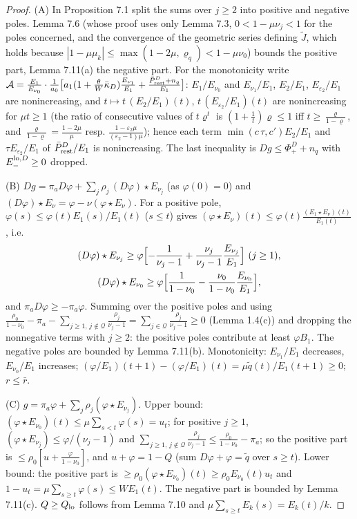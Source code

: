 \documentclass[11pt,a4paper]{article}
\theoremstyle{definition}
\theoremstyle{remark}
\begin{document}
\begin{proof}
(A) In Proposition 7.1 split the sums over $j\ge2$ into positive and negative poles. Lemma 7.6 (whose proof uses only Lemma 7.3, $0<1-\mu\nu_j<1$ for the poles concerned, and the convergence of the geometric series defining $\tilde J$, which holds because $|1-\mu\mu_k|\le\max(1-2\mu,\varrho_q)<1-\mu\nu_0$) bounds the positive part, Lemma 7.11(a) the negative part. For the monotonicity write $\mathcal A=\frac{E_1}{E_{\nu_0}}\cdot\frac{1}{a_0}\bigl[a_1(1+\frac\theta W\bar\kappa_D)\frac{E_{\nu_1}}{E_1}+\frac{\bar P^D_{\rm rest}+n_q}{E_1}\bigr]$: $E_1/E_{\nu_0}$ and $E_{\nu_1}/E_1$, $E_2/E_1$, $E_{\varepsilon_2}/E_1$ are nonincreasing, and $t\mapsto t\,(E_2/E_1)(t)$, $t\,(E_{\varepsilon_2}/E_1)(t)$ are nonincreasing for $\mu t\ge1$ (the ratio of consecutive values of $t\varrho^t$ is $(1+\frac1t)\varrho\le1$ iff $t\ge\frac{\varrho}{1-\varrho}$, and $\frac{\varrho}{1-\varrho}=\frac{1-2\mu}{\mu}$ resp. $\frac{1-\varepsilon_2\mu}{(\varepsilon_2-1)\mu}$); hence each term $\min(c\,\tau,c')E_2/E_1$ and $\tau E_{\varepsilon_2}/E_1$ of $\bar P^D_{\rm rest}/E_1$ is nonincreasing. The last inequality is $Dg\le\Phi^D_++n_q$ with $E_-^{{\rm lo},D}\ge0$ dropped.

(B) $Dg=\pi_aD\varphi+\sum_j\rho_j\,(D\varphi)\star E_{\nu_j}$ (as $\varphi(0)=0$) and $(D\varphi)\star E_\nu=\varphi-\nu(\varphi\star E_\nu)$. For a positive pole, $\varphi(s)\le\varphi(t)E_1(s)/E_1(t)$ ($s\le t$) gives $(\varphi\star E_\nu)(t)\le\varphi(t)\frac{(E_1\star E_\nu)(t)}{E_1(t)}$, i.e.
\begin{gather*}
(D\varphi)\star E_{\nu_j}\ge\varphi\Bigl[-\frac{1}{\nu_j-1}+\frac{\nu_j}{\nu_j-1}\frac{E_{\nu_j}}{E_1}\Bigr]\ (j\ge1), \\
(D\varphi)\star E_{\nu_0}\ge\varphi\Bigl[\frac{1}{1-\nu_0}-\frac{\nu_0}{1-\nu_0}\frac{E_{\nu_0}}{E_1}\Bigr],
\end{gather*}
and $\pi_aD\varphi\ge-\pi_a\varphi$. Summing over the positive poles and using $\frac{\rho_0}{1-\nu_0}-\pi_a-\sum_{j\ge1,\,j\notin\mathcal Q}\frac{\rho_j}{\nu_j-1}=\sum_{j\in\mathcal Q}\frac{\rho_j}{\nu_j-1}\ge0$ (Lemma 1.4(c)) and dropping the nonnegative terms with $j\ge2$: the positive poles contribute at least $\varphi B_1$. The negative poles are bounded by Lemma 7.11(b). Monotonicity: $E_{\nu_1}/E_1$ decreases, $E_{\nu_0}/E_1$ increases; $(\varphi/E_1)(t+1)-(\varphi/E_1)(t)=\mu\tilde q(t)/E_1(t+1)\ge0$; $r\le\bar r$.

(C) $g=\pi_a\varphi+\sum_j\rho_j(\varphi\star E_{\nu_j})$. Upper bound: $(\varphi\star E_{\nu_0})(t)\le\mu\sum_{s<t}\varphi(s)=u_t$; for positive $j\ge1$, $(\varphi\star E_{\nu_j})\le\varphi/(\nu_j-1)$ and $\sum_{j\ge1,\,j\notin\mathcal Q}\frac{\rho_j}{\nu_j-1}\le\frac{\rho_0}{1-\nu_0}-\pi_a$; so the positive part is $\le\rho_0[u+\frac{\varphi}{1-\nu_0}]$, and $u+\varphi=1-Q$ (sum $D\varphi+\varphi=\tilde q$ over $s\ge t$). Lower bound: the positive part is $\ge\rho_0(\varphi\star E_{\nu_0})(t)\ge\rho_0E_{\nu_0}(t)u_t$ and $1-u_t=\mu\sum_{s\ge t}\varphi(s)\le WE_1(t)$. The negative part is bounded by Lemma 7.11(c). $Q\ge Q_{\rm lo}$ follows from Lemma 7.10 and $\mu\sum_{s\ge t}E_k(s)=E_k(t)/k$.
\end{proof}
\end{document}
